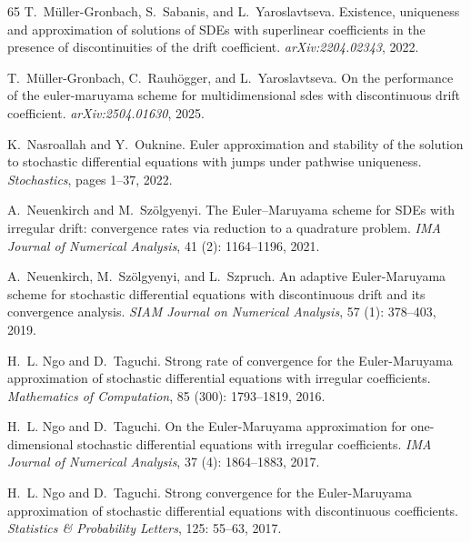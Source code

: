 \documentclass[11pt,a4paper]{article}
\numberwithin{equation}{section}
\theoremstyle{definition}
\begin{document}
{\begin{thebibliography}{65}
T.~M{\"u}ller-Gronbach, S.~Sabanis, and L.~Yaroslavtseva.
\newblock Existence, uniqueness and approximation of solutions of {SDE}s with superlinear coefficients in the presence of discontinuities of the drift coefficient.
\newblock \emph{arXiv:2204.02343}, 2022.

T.~M{\"u}ller-Gronbach, C.~Rauh{\"o}gger, and L.~Yaroslavtseva.
\newblock On the performance of the euler-maruyama scheme for multidimensional sdes with discontinuous drift coefficient.
\newblock \emph{arXiv:2504.01630}, 2025.

K.~Nasroallah and Y.~Ouknine.
\newblock Euler approximation and stability of the solution to stochastic differential equations with jumps under pathwise uniqueness.
\newblock \emph{Stochastics}, pages 1--37, 2022.

A.~Neuenkirch and M.~Sz{\"o}lgyenyi.
\newblock The {E}uler--{M}aruyama scheme for {SDE}s with irregular drift: convergence rates via reduction to a quadrature problem.
\newblock \emph{IMA Journal of Numerical Analysis}, 41 (2): 1164--1196, 2021.

A.~Neuenkirch, M.~Sz\"olgyenyi, and L.~Szpruch.
\newblock An adaptive {E}uler-{M}aruyama scheme for stochastic differential equations with discontinuous drift and its convergence analysis.
\newblock \emph{SIAM Journal on Numerical Analysis}, 57 (1): 378--403, 2019.

H.~L. Ngo and D.~Taguchi.
\newblock Strong rate of convergence for the {E}uler-{M}aruyama approximation of stochastic differential equations with irregular coefficients.
\newblock \emph{Mathematics of Computation}, 85 (300): 1793--1819, 2016.

H.~L. Ngo and D.~Taguchi.
\newblock On the {E}uler-{M}aruyama approximation for one-dimensional stochastic differential equations with irregular coefficients.
\newblock \emph{IMA Journal of Numerical Analysis}, 37 (4): 1864--1883, 2017{}.

H.~L. Ngo and D.~Taguchi.
\newblock Strong convergence for the {E}uler-{M}aruyama approximation of stochastic differential equations with discontinuous coefficients.
\newblock \emph{Statistics \& Probability Letters}, 125: 55--63, 2017{}.


\end{thebibliography}}
\end{document}
